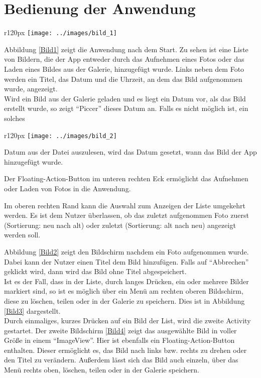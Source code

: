 
\chapter{Bedienung der Anwendung}
\begin{wrapfigure}{r}{120px}
\label{Bild1}
\centering
\texttt{[image: ../images/bild\_1]}
\caption{Übersicht}
\end{wrapfigure}
Abbildung \ref{Bild1} zeigt die Anwendung nach dem Start. Zu sehen ist eine Liste von Bildern, die der App entweder durch das Aufnehmen eines Fotos oder das Laden eines Bildes
aus der Galerie, hinzugefügt wurde. Links neben dem Foto werden ein Titel, das Datum und die Uhrzeit, an dem das Bild aufgenommen wurde, angezeigt. \\
Wird ein Bild aus der Galerie geladen und es liegt ein Datum vor, als das Bild erstellt wurde, so zeigt \enquote{Piccer} dieses Datum an. Falls es nicht möglich ist, ein solches
\begin{wrapfigure}{r}{120px}
\label{Bild2}
\centering
\texttt{[image: ../images/bild\_2]}
\caption{Titel vergeben}
\end{wrapfigure}
Datum aus der Datei auszulesen, wird das Datum gesetzt, wann das Bild der App hinzugefügt wurde.


Der Floating-Action-Button im unteren rechten Eck ermöglicht das Aufnehmen oder Laden von Fotos in die Anwendung.

Im oberen rechten Rand kann die Auswahl zum Anzeigen der Liste umgekehrt werden. Es ist dem Nutzer überlassen, ob das zuletzt aufgenommen Foto zuerst (Sortierung: neu nach alt) oder zuletzt (Sortierung: alt nach neu) angezeigt werden soll.


Abbildung \ref{Bild2} zeigt den Bildschirm nachdem ein Foto aufgenommen wurde.
Dabei kann der Nutzer einen Titel dem Bild hinzufügen. Falls auf \enquote{Abbrechen}
 geklickt wird, dann wird das Bild ohne Titel abgespeichert.\\

Ist es der Fall, dass in der Liste, durch langes Drücken, ein oder mehrere Bilder markiert sind, so ist es möglich über ein Menü am rechten oberen Bildschirm, diese zu löschen, teilen oder in der Galerie zu speichern. Dies ist in Abbildung \ref{Bild3} dargestellt.\\

Durch einmaliges, kurzes Drücken auf ein Bild der List, wird die zweite Activity
gestartet. Der zweite Bildschirm \ref{Bild4} zeigt das ausgewählte Bild in voller Größe in einem \enquote{ImageView}. Hier ist ebenfalls ein Floating-Action-Button enthalten. Dieser ermöglicht es, das Bild nach links bzw. rechts zu drehen oder den Titel zu verändern.
Außerdem lässt sich das Bild auch einzeln, über das Menü rechts oben, löschen, teilen oder in der Galerie speichern.

